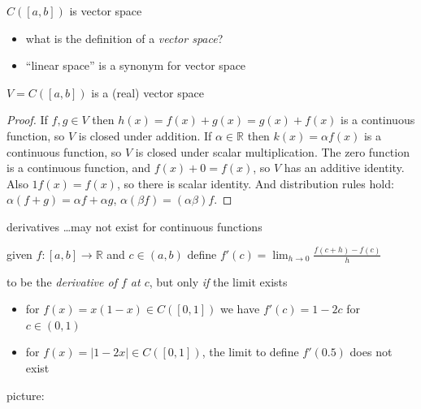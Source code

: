 \documentclass[10pt,
               svgnames,
               hyperref={colorlinks,citecolor=DeepPink4,linkcolor=FireBrick,urlcolor=Maroon},
               usepdftitle=false]{beamer}
\newcommand{\RR}{\mathbb{R}}
\newcommand{\ds}{\displaystyle}
\begin{document}
\begin{frame}{$C([a,b])$ is vector space}

\begin{itemize}
\item what is the definition of a \emph{vector space}?
\item ``linear space'' is a synonym for vector space
\end{itemize}

\begin{theorem}
$V=C([a,b])$ is a (real) vector space
\end{theorem}

\begin{proof}
If $f,g \in V$ then $h(x) = f(x)+g(x)=g(x)+f(x)$ is a continuous function, so $V$ is closed under addition.  If $\alpha\in \RR$ then $k(x)=\alpha f(x)$ is a continuous function, so $V$ is closed under scalar multiplication.   The zero function is a continuous function, and $f(x)+0=f(x)$, so $V$ has an additive identity.  Also $1 f(x) = f(x)$, so there is scalar identity.  And distribution rules hold: $\alpha(f+g) = \alpha f + \alpha g$, $\alpha(\beta f) = (\alpha \beta) f$.
\end{proof}

\vspace{30mm}
\end{frame}


\begin{frame}{derivatives \dots may not exist for continuous functions}

\begin{definition}
given $f:[a,b] \to \RR$ and $c\in (a,b)$ define \quad $\ds f'(c) = \lim_{h\to 0} \frac{f(c+h) - f(c)}{h}$

to be the \emph{derivative of $f$ at $c$}, but only \emph{if} the limit exists
\end{definition}

\begin{itemize}
\item for $f(x) = x(1-x) \in C([0,1])$ we have $f'(c) = 1 - 2 c$ for $c\in (0,1)$
\item for $f(x) = |1 - 2 x| \in C([0,1])$,  the limit to define $f'(0.5)$ does not exist
\end{itemize}

\bigskip
picture:

\vspace{30mm}
\end{frame}
\end{document}

